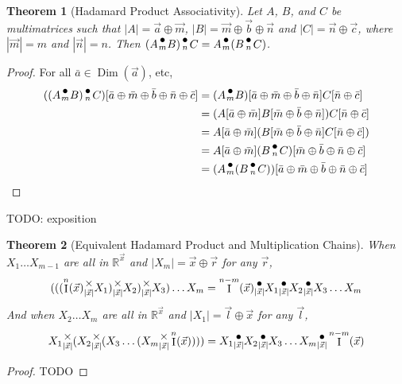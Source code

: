 \documentclass[12pt]{book}
\theoremstyle{plain}
\newtheorem{theorem}{Theorem}[chapter]
\theoremstyle{definition}
\theoremstyle{ppart}
\theoremstyle{case}
\theoremstyle{solution}
\DeclareMathOperator{\Dim}{Dim}
\DeclareMathOperator{\Ident}{I}
\newcommand{\mmult}[1]{\text{\raisebox{1ex}{$\underset{#1}{\times}$}}}
\newcommand{\dmult}[1]{\text{\raisebox{1ex}{$\underset{#1}{\,\bullet\,}$}}}
\newcommand{\shape}[1]{\left|#1\right|}
\begin{document}
\begin{theorem}[Hadamard Product Associativity]
Let $A$, $B$, and $C$ be multimatrices such that $\shape{A} = \vec{a} \oplus \vec{m}$,
$\shape{B} = \vec{m} \oplus \vec{b} \oplus \vec{n}$ and $\shape{C} = \vec{n} \oplus \vec{c}$,
where $\shape{\vec{m}} = m$ and $\shape{\vec{n}} = n$.
Then $(A \dmult{m} B) \dmult{n} C = A \dmult{m} (B \dmult{n} C)$.
\end{theorem}
\begin{proof}
For all $\bar{a} \in \Dim(\vec{a})$, etc,
\begin{align*}
((A \dmult{m} B) \dmult{n} C)[\bar{a} \oplus \bar{m} \oplus \bar{b} \oplus \bar{n} \oplus \bar{c}]
  &= (A \dmult{m} B)[\bar{a} \oplus \bar{m} \oplus \bar{b} \oplus \bar{n}] C[\bar{n} \oplus \bar{c}] \\
  &= (A[\bar{a} \oplus \bar{m}] B[\bar{m} \oplus \bar{b} \oplus \bar{n}]) C[\bar{n} \oplus \bar{c}] \\
  &= A[\bar{a} \oplus \bar{m}] (B[\bar{m} \oplus \bar{b} \oplus \bar{n}] C[\bar{n} \oplus \bar{c}]) \\
  &= A[\bar{a} \oplus \bar{m}] (B \dmult{n} C)[\bar{m} \oplus \bar{b} \oplus \bar{n} \oplus \bar{c}] \\
  &= (A \dmult{m} (B \dmult{n} C))[\bar{a} \oplus \bar{m} \oplus \bar{b} \oplus \bar{n} \oplus \bar{c}]
\end{align*}
\end{proof}

TODO: exposition

\begin{theorem}[Equivalent Hadamard Product and Multiplication Chains]
When $X_1 \ldots X_{m-1}$ are all in $\mathbb{R}^{\vec{x}}$ and
$\shape{X_m} = \vec{x} \oplus \vec{r}$ for any $\vec{r}$,
\[
  (((\Ident^n(\vec{x})
  \mmult{\shape{\vec{x}}} X_1) \mmult{\shape{\vec{x}}} X_2) \mmult{\shape{\vec{x}}} X_3)
  \ldots X_m
  =
  \Ident^{n-m}(\vec{x})
  \dmult{\shape{\vec{x}}} X_1 \dmult{\shape{\vec{x}}} X_2 \dmult{\shape{\vec{x}}} X_3
  \ldots X_m
\]
And when $X_2 \ldots X_m$ are all in $\mathbb{R}^{\vec{x}}$ and
$\shape{X_1} = \vec{l} \oplus \vec{x}$ for any $\vec{l}$,
\[
  X_1 \mmult{\shape{\vec{x}}} (X_2 \mmult{\shape{\vec{x}}} (X_3
  \ldots (X_m \mmult{\shape{\vec{x}}} 
  \Ident^n(\vec{x}))))
  =
  X_1 \dmult{\shape{\vec{x}}} X_2 \dmult{\shape{\vec{x}}} X_3
  \ldots X_m \dmult{\shape{\vec{x}}} 
  \Ident^{n-m}(\vec{x})
\]
\end{theorem}
\begin{proof}
TODO 
\end{proof}
\end{document}
